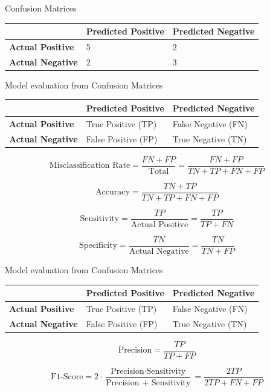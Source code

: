 \documentclass[
  ignorenonframetext,
]{beamer}
\begin{document}
\begin{frame}{Confusion Matrices}
\protect\hypertarget{confusion-matrices-2}{}

\begin{longtable}[]{@{}lll@{}}
\toprule
& Predicted Positive & Predicted Negative\tabularnewline
\midrule
\endhead
\textbf{Actual Positive} & 5 & 2\tabularnewline
\textbf{Actual Negative} & 2 & 3\tabularnewline
\bottomrule
\end{longtable}

\end{frame}

\begin{frame}{Model evaluation from Confusion Matrices}
\protect\hypertarget{model-evaluation-from-confusion-matrices}{}

\begin{longtable}[]{@{}lll@{}}
\toprule
& Predicted Positive & Predicted Negative\tabularnewline
\midrule
\endhead
\textbf{Actual Positive} & True Positive (TP) & False Negative
(FN)\tabularnewline
\textbf{Actual Negative} & False Positive (FP) & True Negative
(TN)\tabularnewline
\bottomrule
\end{longtable}

\[
\text{Misclassification Rate} =  \frac{FN + FP}{\text{Total}} = \frac{FN + FP}{TN+TP+FN+FP} 
\]

\[
\text{Accuracy} = \frac{TN+TP}{TN+TP+FN+FP} 
\]

\[
\text{Sensitivity} = \frac{TP}{\text{Actual Positive}} = \frac{TP}{TP+FN} 
\]

\[
\text{Specificity} = \frac{TN}{\text{Actual Negative}} = \frac{TN}{TN+FP}
\]

\end{frame}

\begin{frame}{Model evaluation from Confusion Matrices}
\protect\hypertarget{model-evaluation-from-confusion-matrices-1}{}

\begin{longtable}[]{@{}lll@{}}
\toprule
& Predicted Positive & Predicted Negative\tabularnewline
\midrule
\endhead
\textbf{Actual Positive} & True Positive (TP) & False Negative
(FN)\tabularnewline
\textbf{Actual Negative} & False Positive (FP) & True Negative
(TN)\tabularnewline
\bottomrule
\end{longtable}

\[
\text{Precision} = \frac{TP}{TP+FP} 
\]

\[
\text{F1-Score} =2\cdot  \frac{\text{Precision} \cdot \text{Sensitivity}}{\text{Precision + Sensitivity}} = \frac{2TP}{2TP+FN+FP}
\]

\end{frame}
\end{document}

